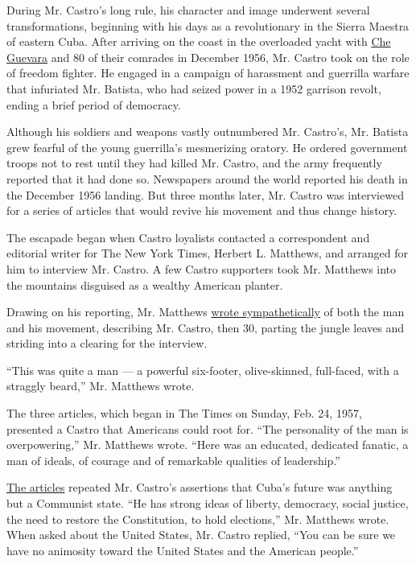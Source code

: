 During Mr. Castro's long rule, his character and image underwent several
transformations, beginning with his days as a revolutionary in the
Sierra Maestra of eastern Cuba. After arriving on the coast in the
overloaded yacht with
\href{http://timesmachine.nytimes3xbfgragh.onion/timesmachine/1967/10/11/80715565.html?pageNumber=18\&rpm=true}{Che
Guevara} and 80 of their comrades in December 1956, Mr. Castro took on
the role of freedom fighter. He engaged in a campaign of harassment and
guerrilla warfare that infuriated Mr. Batista, who had seized power in a
1952 garrison revolt, ending a brief period of democracy.

Although his soldiers and weapons vastly outnumbered Mr. Castro's, Mr.
Batista grew fearful of the young guerrilla's mesmerizing oratory. He
ordered government troops not to rest until they had killed Mr. Castro,
and the army frequently reported that it had done so. Newspapers around
the world reported his death in the December 1956 landing. But three
months later, Mr. Castro was interviewed for a series of articles that
would revive his movement and thus change history.

The escapade began when Castro loyalists contacted a correspondent and
editorial writer for The New York Times, Herbert L. Matthews, and
arranged for him to interview Mr. Castro. A few Castro supporters took
Mr. Matthews into the mountains disguised as a wealthy American planter.

Drawing on his reporting, Mr. Matthews
\href{http://www.nytimes3xbfgragh.onion/packages/html/books/matthews/matthews022457.pdf}{wrote
sympathetically} of both the man and his movement, describing Mr.
Castro, then 30, parting the jungle leaves and striding into a clearing
for the interview.

``This was quite a man --- a powerful six-footer, olive-skinned,
full-faced, with a straggly beard,'' Mr. Matthews wrote.

The three articles, which began in The Times on Sunday, Feb. 24, 1957,
presented a Castro that Americans could root for. ``The personality of
the man is overpowering,'' Mr. Matthews wrote. ``Here was an educated,
dedicated fanatic, a man of ideals, of courage and of remarkable
qualities of leadership.''

\href{http://timesmachine.nytimes3xbfgragh.onion/timesmachine/1959/03/08/89158388.html?pageNumber=288\&rpm=true\&zoom=16}{The
articles} repeated Mr. Castro's assertions that Cuba's future was
anything but a Communist state. ``He has strong ideas of liberty,
democracy, social justice, the need to restore the Constitution, to hold
elections,'' Mr. Matthews wrote. When asked about the United States, Mr.
Castro replied, ``You can be sure we have no animosity toward the United
States and the American people.''

